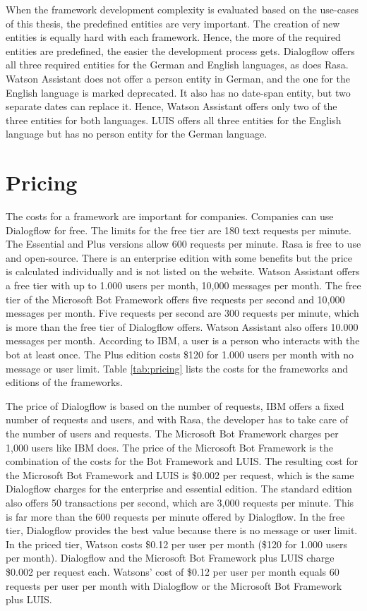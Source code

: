 When the framework development complexity is evaluated based on the use-cases of this thesis, the predefined entities are very important.
The creation of new entities is equally hard with each framework.
Hence, the more of the required entities are predefined, the easier the development process gets.
Dialogflow offers all three required entities for the German and English languages, as does Rasa.
Watson Assistant does not offer a person entity in German, and the one for the English language is marked deprecated.
It also has no date-span entity, but two separate dates can replace it.
Hence, Watson Assistant offers only two of the three entities for both languages. 
LUIS offers all three entities for the English language but has no person entity for the German language. 

\section*{Pricing} \label{sec:pricing}
The costs for a framework are important for companies.
Companies can use Dialogflow for free.
The limits for the free tier are 180 text requests per minute.
The Essential and Plus versions allow 600 requests per minute.
Rasa is free to use and open-source.
There is an enterprise edition with some benefits but the price
is calculated individually and is not listed on the website.
Watson Assistant offers a free tier with up to 1.000 users per month, 
10,000 messages per month.
The free tier of the Microsoft Bot Framework offers five requests per second and 10,000 messages per month. 
Five requests per second are 300 requests per minute, which is more than the free tier of Dialogflow offers.
Watson Assistant also offers 10.000 messages per month.
According to IBM, a user is a person who interacts with the bot at least once.
The Plus edition costs \$120 for 1.000 users per month with
no message or user limit.
Table \ref{tab:pricing} lists the costs for the frameworks and editions of the frameworks.

The price of Dialogflow is based on the number of requests, IBM offers a fixed number of requests and users, and with Rasa, the developer has to take care of the number of users and requests.
The Microsoft Bot Framework charges per 1,000 users like IBM does.
The price of the Microsoft Bot Framework is the combination of the costs for the Bot Framework and LUIS.
The resulting cost for the Microsoft Bot Framework and LUIS is \$0.002 per request, which is the same Dialogflow charges for the enterprise and essential edition.  
The standard edition also offers 50 transactions per second, which are 3,000 requests per minute.
This is far more than the 600 requests per minute offered by Dialogflow.
In the free tier, Dialogflow provides the best value because there is no message or user limit.
In the priced tier, Watson costs \$0.12 per user per month (\$120 for 1.000 users per month).
Dialogflow and the Microsoft Bot Framework plus LUIS charge \$0.002 per request each.
Watsons' cost of \$0.12 per user per month equals 60 requests per user per month with Dialogflow or the Microsoft Bot Framework plus LUIS.


